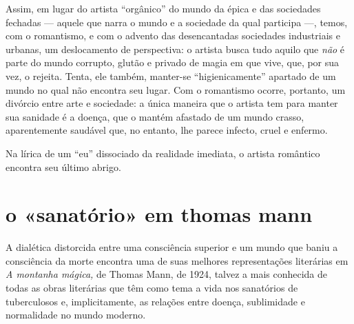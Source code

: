 
Assim, em lugar do artista ``orgânico'' do mundo da épica e das
sociedades fechadas --- aquele que narra o mundo e a sociedade da qual
participa ---, temos, com o romantismo, e com o advento das
desencantadas sociedades industriais e urbanas, um deslocamento de
perspectiva: o artista busca tudo aquilo que \emph{não} é parte do mundo
corrupto, glutão e privado de magia em que vive, que, por sua vez, o
rejeita. Tenta, ele também, manter-se ``higienicamente'' apartado de um
mundo no qual não encontra seu lugar. Com o romantismo ocorre, portanto,
um divórcio entre arte e sociedade: a única maneira que o artista tem
para manter sua sanidade é a doença, que o mantém afastado de um mundo
crasso, aparentemente saudável que, no entanto, lhe parece infecto,
cruel e enfermo.


Na lírica de um ``eu'' dissociado da realidade imediata, o artista
romântico encontra seu último abrigo.

\section{o «sanatório» em thomas mann}

A dialética distorcida entre uma consciência superior e um mundo que
baniu a consciência da morte encontra uma de suas melhores
representações literárias em \emph{A montanha mágica,} de Thomas Mann,
de 1924, talvez a mais conhecida de todas as obras literárias que têm
como tema a vida nos sanatórios de tuberculosos e, implicitamente, as
relações entre doença, sublimidade e normalidade no mundo moderno.

